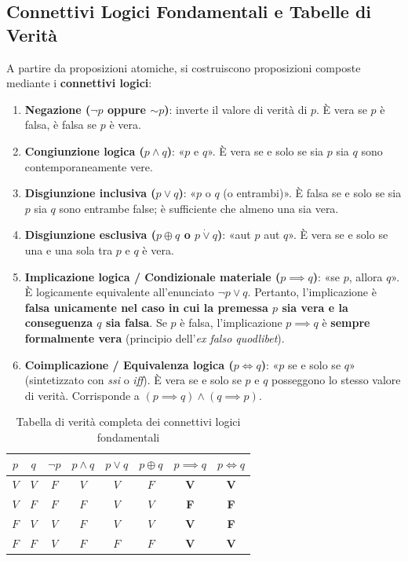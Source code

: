 \subsection{Connettivi Logici Fondamentali e Tabelle di Verità}

A partire da proposizioni atomiche, si costruiscono proposizioni composte mediante i \textbf{connettivi logici}:

\begin{enumerate}
    \item \textbf{Negazione ($\neg p$ oppure $\sim p$)}: inverte il valore di verità di $p$. È vera se $p$ è falsa, è falsa se $p$ è vera.
    \item \textbf{Congiunzione logica ($p \land q$)}: «$p$ e $q$». È vera se e solo se sia $p$ sia $q$ sono contemporaneamente vere.
    \item \textbf{Disgiunzione inclusiva ($p \lor q$)}: «$p$ o $q$ (o entrambi)». È falsa se e solo se sia $p$ sia $q$ sono entrambe false; è sufficiente che almeno una sia vera.
    \item \textbf{Disgiunzione esclusiva ($p \oplus q$ o $p \mathbin{\dot{\lor}} q$)}: «aut $p$ aut $q$». È vera se e solo se una e una sola tra $p$ e $q$ è vera.
    \item \textbf{Implicazione logica / Condizionale materiale ($p \implies q$)}: «se $p$, allora $q$». È logicamente equivalente all'enunciato $\neg p \lor q$. Pertanto, l'implicazione è \textbf{falsa unicamente nel caso in cui la premessa $p$ sia vera e la conseguenza $q$ sia falsa}. Se $p$ è falsa, l'implicazione $p \implies q$ è \textbf{sempre formalmente vera} (principio dell'\emph{ex falso quodlibet}).
    \item \textbf{Coimplicazione / Equivalenza logica ($p \iff q$)}: «$p$ se e solo se $q$» (sintetizzato con \emph{ssi} o \emph{iff}). È vera se e solo se $p$ e $q$ posseggono lo stesso valore di verità. Corrisponde a $(p \implies q) \land (q \implies p)$.
\end{enumerate}

\begin{table}[htbp]
\centering
\caption{Tabella di verità completa dei connettivi logici fondamentali}
\label{tab:verita}
\begin{tabular}{cc|c|c|c|c|c|c}
\toprule
$p$ & $q$ & $\neg p$ & $p \land q$ & $p \lor q$ & $p \oplus q$ & $p \implies q$ & $p \iff q$ \\
\midrule
$V$ & $V$ & $F$ & $V$ & $V$ & $F$ & \textbf{V} & \textbf{V} \\
$V$ & $F$ & $F$ & $F$ & $V$ & $V$ & \textbf{F} & \textbf{F} \\
$F$ & $V$ & $V$ & $F$ & $V$ & $V$ & \textbf{V} & \textbf{F} \\
$F$ & $F$ & $V$ & $F$ & $F$ & $F$ & \textbf{V} & \textbf{V} \\
\bottomrule
\end{tabular}
\end{table}

